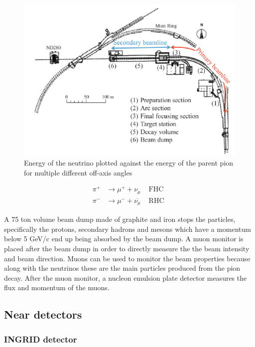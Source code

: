 \begin{figure}
    \includegraphics[width=\textwidth]{Figures/nubeamline.png}
    \caption{Energy of the neutrino plotted against the energy of the parent pion for multiple different off-axis angles}
        \label{fig:nubeamline}
\end{figure}

\begin{equation}
\begin{array}{lll}
\pi^{+} & \longrightarrow \mu^{+}+\nu_{\mu} & \text { FHC } \\
\pi^{-} & \longrightarrow \mu^{-}+\overline{\nu_{\mu}} & \text { RHC }
\end{array}
\label{eq:nubeam}
\end{equation}

A 75 ton volume beam dump made of graphite and iron stops the particles, specifically the protons, secondary hadrons and mesons which have a momentum below 5 GeV/c end up being absorbed by the beam dump. A muon monitor is placed after the beam dump in order to directly measure the the beam intensity and beam direction. Muons can be used to monitor the beam properties because along with the neutrinos these are the main particles produced from the pion decay. After the muon monitor, a nucleon emulsion plate detector measures the flux and momentum of the muons. 

\subsection{Near detectors}

\subsubsection{INGRID detector}

